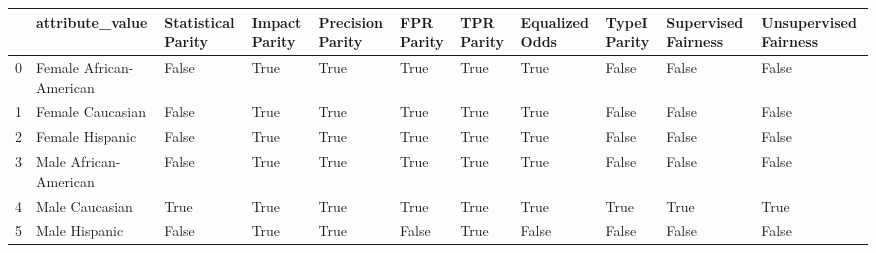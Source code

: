 \begin{tabular}{lllllllllll}
\toprule
{} &          attribute\_value &  Statistical Parity &  Impact Parity &  Precision Parity &  FPR Parity &  TPR Parity &  Equalized Odds &  TypeI Parity &  Supervised Fairness &  Unsupervised Fairness \\
\midrule
0 &  Female African-American &               False &           True &              True &        True &        True &            True &         False &                False &                  False \\
1 &         Female Caucasian &               False &           True &              True &        True &        True &            True &         False &                False &                  False \\
2 &          Female Hispanic &               False &           True &              True &        True &        True &            True &         False &                False &                  False \\
3 &    Male African-American &               False &           True &              True &        True &        True &            True &         False &                False &                  False \\
4 &           Male Caucasian &                True &           True &              True &        True &        True &            True &          True &                 True &                   True \\
5 &            Male Hispanic &               False &           True &              True &       False &        True &           False &         False &                False &                  False \\
\bottomrule
\end{tabular}

